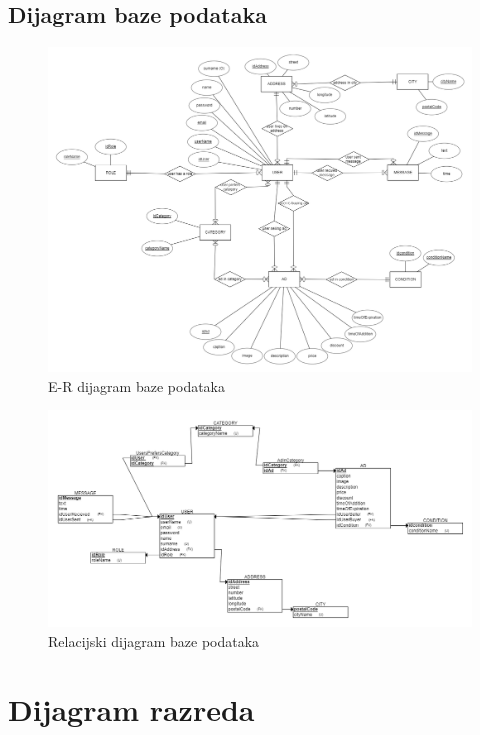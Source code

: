 			
			\subsection{Dijagram baze podataka}
			
				\begin{figure}[H]
			\includegraphics[scale=0.4]{slike/DatabaseER.PNG} %
			\centering
			\caption{E-R dijagram baze podataka}
			\label{fig:dijagramBaze1}
		\end{figure}
	
	\begin{figure}[H]
		\includegraphics[scale=0.4]{slike/DijagramBaze.PNG} %
		\centering
		\caption{Relacijski dijagram baze podataka}
		\label{fig:dijagramBaze2}
	\end{figure}
			\eject
			
		\section{Dijagram razreda}
		
